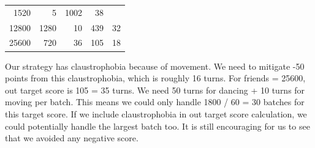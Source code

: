 \begin{longtable}[c]{@{}rrrrr@{}}
\begin{minipage}[t]{0.16\columnwidth}
1520
\strut\end{minipage} &
\begin{minipage}[t]{0.17\columnwidth}\raggedleft\strut
5
\strut\end{minipage} &
\begin{minipage}[t]{0.18\columnwidth}\raggedleft\strut
1002
\strut\end{minipage} &
\begin{minipage}[t]{0.23\columnwidth}\raggedleft\strut
38
\strut\end{minipage}\tabularnewline
\begin{minipage}[t]{0.12\columnwidth}\raggedleft\strut
12800
\strut\end{minipage} &
\begin{minipage}[t]{0.16\columnwidth}\raggedleft\strut
1280
\strut\end{minipage} &
\begin{minipage}[t]{0.17\columnwidth}\raggedleft\strut
10
\strut\end{minipage} &
\begin{minipage}[t]{0.18\columnwidth}\raggedleft\strut
439
\strut\end{minipage} &
\begin{minipage}[t]{0.23\columnwidth}\raggedleft\strut
32
\strut\end{minipage}\tabularnewline
\begin{minipage}[t]{0.12\columnwidth}\raggedleft\strut
25600
\strut\end{minipage} &
\begin{minipage}[t]{0.16\columnwidth}\raggedleft\strut
720
\strut\end{minipage} &
\begin{minipage}[t]{0.17\columnwidth}\raggedleft\strut
36
\strut\end{minipage} &
\begin{minipage}[t]{0.18\columnwidth}\raggedleft\strut
105
\strut\end{minipage} &
\begin{minipage}[t]{0.23\columnwidth}\raggedleft\strut
18
\strut\end{minipage}\tabularnewline
\bottomrule
\end{longtable}

\newpage

Our strategy has claustrophobia because of movement. We need to mitigate
-50 points from this claustrophobia, which is roughly 16 turns. For
friends = 25600, out target score is 105 = 35 turns. We need 50 turns
for dancing + 10 turns for moving per batch. This means we could only
handle 1800 / 60 = 30 batches for this target score. If we include
claustrophobia in out target score calculation, we could potentially
handle the largest batch too. It is still encouraging for us to see that
we avoided any negative score.
